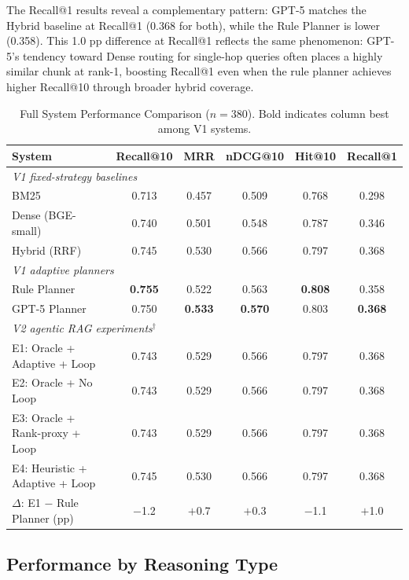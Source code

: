 \documentclass[11pt, a4paper]{article}
\begin{document}
The Recall@1 results reveal a complementary pattern: GPT-5 matches the Hybrid baseline at Recall@1 (0.368 for both), while the Rule Planner is lower (0.358). This 1.0 pp difference at Recall@1 reflects the same phenomenon: GPT-5's tendency toward Dense routing for single-hop queries often places a highly similar chunk at rank-1, boosting Recall@1 even when the rule planner achieves higher Recall@10 through broader hybrid coverage.

\begin{table}[htbp]
\centering
\caption{Full System Performance Comparison ($n{=}380$). Bold indicates column best among V1 systems.}
\label{tab:main}
\begin{tabular}{lccccc}
\toprule
\textbf{System} & \textbf{Recall@10} & \textbf{MRR} & \textbf{nDCG@10} & \textbf{Hit@10} & \textbf{Recall@1} \\
\midrule
\multicolumn{6}{l}{\textit{V1 fixed-strategy baselines}} \\
BM25               & 0.713 & 0.457 & 0.509 & 0.768 & 0.298 \\
Dense (BGE-small)  & 0.740 & 0.501 & 0.548 & 0.787 & 0.346 \\
Hybrid (RRF)       & 0.745 & 0.530 & 0.566 & 0.797 & 0.368 \\
\multicolumn{6}{l}{\textit{V1 adaptive planners}} \\
Rule Planner       & \textbf{0.755} & 0.522 & 0.563 & \textbf{0.808} & 0.358 \\
GPT-5 Planner      & 0.750 & \textbf{0.533} & \textbf{0.570} & 0.803 & \textbf{0.368} \\
\multicolumn{6}{l}{\textit{V2 agentic RAG experiments}$^\dagger$} \\
E1: Oracle + Adaptive + Loop    & 0.743 & 0.529 & 0.566 & 0.797 & 0.368 \\
E2: Oracle + No Loop            & 0.743 & 0.529 & 0.566 & 0.797 & 0.368 \\
E3: Oracle + Rank-proxy + Loop  & 0.743 & 0.529 & 0.566 & 0.797 & 0.368 \\
E4: Heuristic + Adaptive + Loop & 0.745 & 0.530 & 0.566 & 0.797 & 0.368 \\
\midrule
$\Delta$: E1 $-$ Rule Planner (pp) & $-$1.2 & $+$0.7 & $+$0.3 & $-$1.1 & $+$1.0 \\
\bottomrule
\end{tabular}
\end{table}

\FloatBarrier

\subsection{Performance by Reasoning Type}
\end{document}
